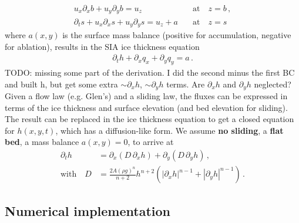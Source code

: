 \documentclass[11pt,a4paper]{article}
\newcommand{\p}{\partial}
\begin{document}
\begin{align}
    u_x \p_x b + u_y \p_y b = u_z \quad 
    & \text{at} \quad z=b
    \,,
    \\
    \p_t s + u_x \p_x s + u_y \p_y s = u_z + a \quad 
    & \text{at} \quad z=s
\end{align}
where $a(x,y)$ is the surface mass balance (positive for accumulation, negative for ablation), results in the SIA ice thickness equation
\begin{align}
    \p_t h + \p_x q_x + \p_y q_y = a \,.
\end{align}
TODO: missing some part of the derivation. I did the second minus the first BC and built h, but get some extra $\sim \p_x h$, $\sim \p_y h$ terms. Are $\p_x h$ and $\p_y h$ neglected?
\\[10pt]
Given a flow law (e.g. Glen's) and a sliding law, the fluxes can be expressed in terms of the ice thickness and surface elevation (and bed elevation for sliding). The result can be replaced in the ice thickness equation to get a closed equation for $h(x,y,t)$, which has a diffusion-like form.
We assume \textbf{no sliding}, a \textbf{flat bed}, a mass balance $a(x,y) = 0$, to arrive at
\begin{align}
    \p_t h 
    & = \p_x \left(D \, \p_x h \right) + \p_y \left(D \, \p_y h \right)
    \,,
    \\
    \text{with} 
    \quad
    D 
    &= \frac{2 A (\rho g)^n}{n+2} h^{n+2} 
    \left( |\p_x h|^{n-1} + |\p_y h|^{n-1} \right)
    \,.
    \nonumber
\end{align}

\subsection{Numerical implementation}
\end{document}
